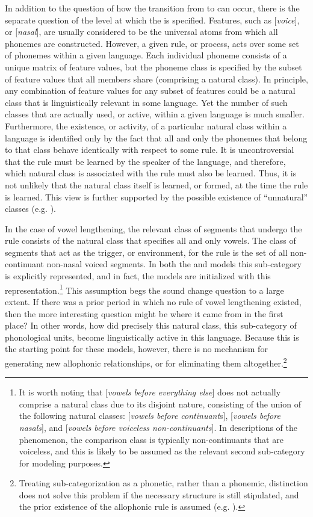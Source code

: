 In addition to the question of how the transition from to can occur, there is the separate question of the
level at which the  is specified. Features, such as {[}\emph{voice}{]},
or {[}\emph{nasal}{]}, are usually considered to be the universal
atoms from which all phonemes are constructed. However, a given rule,
or process, acts over some set of phonemes within a given language.
Each individual phoneme consists of a unique matrix of feature values,
but the phoneme class is specified by the subset of feature values
that all members share (comprising a natural class). In principle,
any combination of feature values for any subset of features could
be a natural class that is linguistically relevant in some language.
Yet the number of such classes that are actually used, or active,
within a given language is much smaller. Furthermore, the existence,
or activity, of a particular natural class within a language is identified
only by the fact that all and only the phonemes that belong to that
class behave identically with respect to some rule. It is uncontroversial
that the rule must be learned by the speaker of the language, and
therefore, which natural class is associated with the rule must also
be learned. Thus, it is not unlikely that the natural class itself
is learned, or formed, at the time the rule is learned. This view
is further supported by the possible existence of “unnatural”
classes (e.g. \citealt{Mielke2008}).

In the case of vowel lengthening, the relevant class of segments that
undergo the rule consists of the natural class that specifies all
and only vowels. The class of segments that act as the trigger, or
environment, for the rule is the set of all non-continuant non-nasal
voiced segments. In both the  and  models
this sub-category is explicitly represented, and in fact, the models
are initialized with this representation.\footnote{It is worth noting that {[}\emph{vowels before everything else}{]}
does not actually comprise a natural class due to its disjoint nature,
consisting of the union of the following natural classes: {[}\emph{vowels
before continuant}s{]}, {[}\emph{vowels before nasals}{]}, and {[}\emph{vowels
before voiceless non-continuants}{]}. In descriptions of the phenomenon,
the comparison class is typically non-continuants that are voiceless,
and this is likely to be assumed as the relevant second sub-category
for modeling purposes.} This assumption begs the sound change question to a large extent.
If there was a prior period in which no rule of vowel lengthening
existed, then the more interesting question might be where it came
from in the first place? In other words, how did precisely this natural
class, this sub-category of phonological units, become linguistically
active in this language. Because this is the starting point for
these models, however, there is no mechanism for generating new allophonic
relationships, or for eliminating them altogether.\footnote{Treating sub-categorization as a phonetic, rather than a phonemic,
distinction does not solve this problem if the necessary structure
is still stipulated, and the prior existence of the allophonic rule
is assumed (e.g. \citealp{dillon2013single}).}

